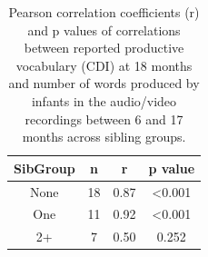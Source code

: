 \documentclass[
  man,mask,floatsintext]{apa6}
\begin{document}
\begin{longtable}[t]{cccc}
\caption{\label{tab:production-corrs}Pearson correlation coefficients (r) and p values of correlations between reported productive vocabulary (CDI) at 18 months and number of words produced by infants in the audio/video recordings between 6 and 17 months across sibling groups.}\\
\toprule
SibGroup & n & r & p value\\
\midrule
None & 18 & 0.87 & <0.001\\
One & 11 & 0.92 & <0.001\\
2+ & 7 & 0.50 & 0.252\\
\bottomrule
\end{longtable}
\end{document}
